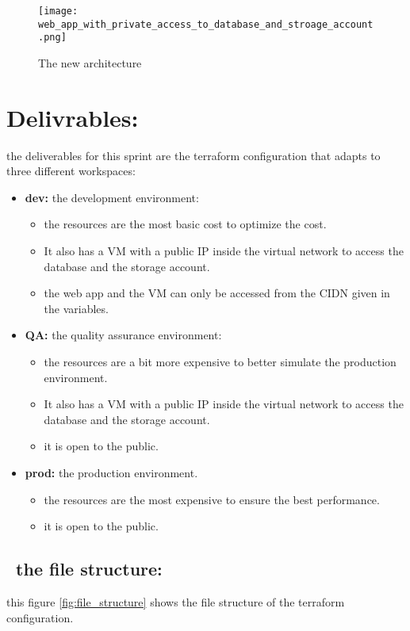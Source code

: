 \begin{figure}[htpb]
    \centering
    \texttt{[image: web\_app\_with\_private\_access\_to\_database\_and\_stroage\_account.png]}
    \caption{The new architecture}
    \label{fig:new_arch}
\end{figure}

\section{Delivrables:}
the deliverables for this sprint are the terraform configuration that adapts to three different workspaces:
\begin{itemize}
    \item \textbf{dev:} the development environment:
          \begin{itemize}
              \item the resources are the most basic cost to optimize the cost.
              \item It also has a VM with a public IP inside the virtual network to access the database and the storage account.
              \item the web app and the VM can only be accessed from the CIDN given in the variables.
          \end{itemize}
    \item \textbf{QA:} the quality assurance environment:
          \begin{itemize}
              \item the resources are a bit more expensive to better simulate the production environment.
              \item It also has a VM with a public IP inside the virtual network to access the database and the storage account.
              \item it is open to the public.
          \end{itemize}
    \item \textbf{prod:} the production environment.
          \begin{itemize}
              \item the resources are the most expensive to ensure the best performance.
              \item it is open to the public.
          \end{itemize}
\end{itemize}
\subsection*{ \textbullet\ the file structure:}
this figure \ref{fig:file_structure} shows the file structure of the terraform configuration.

